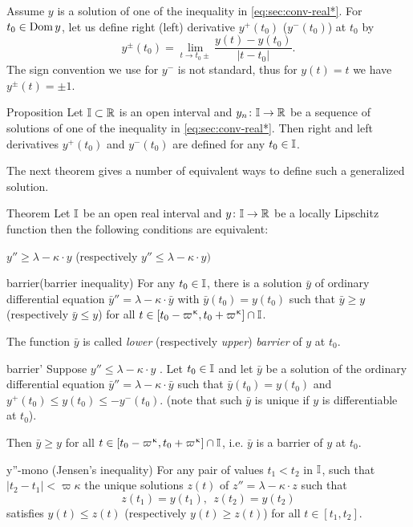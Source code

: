 Assume $y$ is a solution of one of the inequality in \ref{eq:sec:conv-real*}.
For $t_0\in \Dom y$, let us define right (left) derivative $y^+(t_0)$ ($y^-(t_0)$) at $t_0$ by
\[y^\pm(t_0)=\lim_{t\to t_0\pm} \frac{y(t)-y(t_0)}{|t-t_0|}.\]
The sign convention we use for $y^-$ is not standard, thus for $y(t)=t$ we have
$y^\pm(t)=\pm 1$.

\begin{thm}{Proposition}
Let $\II\subset\RR$ is an open interval and $y_n\:\II\to\RR$ be a sequence of solutions of one of the inequality in \ref{eq:sec:conv-real*}.
Then right  and left derivatives $y^+(t_0)$ and $y^-(t_0)$ are defined
for any $t_0\in\II$.
\end{thm}


The next theorem gives a  number of equivalent ways to define such a generalized solution.

\begin{thm}{Theorem}\label{y''=<1-ky}
Let $\mathbb{I}$ be an open real interval and $y\:\II\to\RR$ be a locally Lipschitz function
then the following conditions are equivalent:
\begin{subthm}{}$y''\ge \lambda-\kappa\cdot  y$ (respectively $y''\le \lambda-\kappa\cdot  y)$
\end{subthm}

\begin{subthm}{barrier}(barrier inequality) For any $t_0\in \II$, 
there is a solution $\bar y$ 
of ordinary differential equation $\bar y''=\lambda-\kappa\cdot  \bar y$ 
with $\bar y(t_0)= y(t_0)$ such that $\bar y\ge y$ (respectively $\bar y\le y$) for all $t\in [t_0-\varpi\kappa,t_0+\varpi\kappa]\cap \II$.

The function $\bar y$ is called \emph{lower} (respectively \emph{upper}) \emph{barrier} of $y$ at $t_0$.
\end{subthm}

\begin{subthm}{barrier'} 
Suppose $y''\le \lambda-\kappa\cdot  y$ . Let $t_0\in\II$ and let  $\bar y$ be a solution of  the
 ordinary differential equation $\bar y''=\lambda-\kappa\cdot  \bar y$ 
such that  $\bar y(t_0)= y(t_0)$ and $y^+(t_0)\le y(t_0)\le -y^-(t_0)$. (note that such $\bar{y}$ is unique if $y$ is differentiable at $t_0$). 

Then $\bar y\ge y$  for all $t\in [t_0-\varpi\kappa,t_0+\varpi\kappa]\cap \II$, i.e. $\bar{y}$ is a barrier of $y$ at $t_0$.
\end{subthm}

\begin{subthm}{y''-mono} (Jensen's inequality)
For any pair of values $t_1<t_2$ in $\mathbb{I}$, such that $|t_2-t_1|<\varpi\kappa$ the unique solutions $z(t)$ of $z''=\lambda-\kappa\cdot  z$ such that
\[z(t_1)=y(t_1),\ \ z(t_2)=y(t_2)\] 
satisfies $y(t)\le z(t)$ (respectively $y(t)\ge z(t)$) for all $t\in[t_1,t_2]$.
\end{subthm}
\end{thm}

